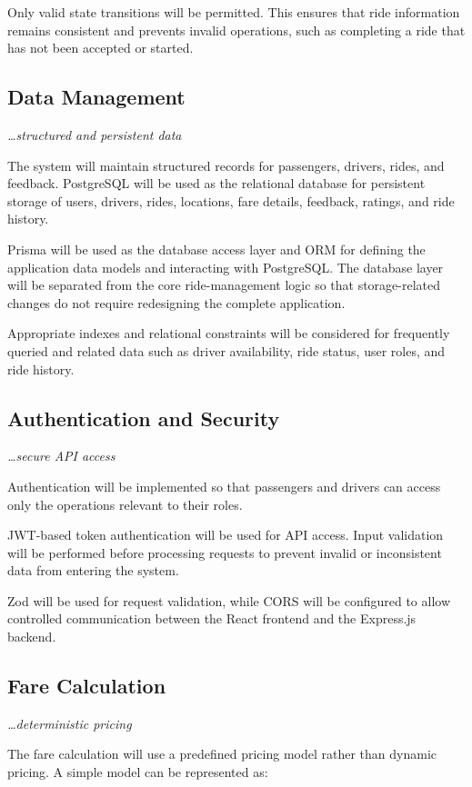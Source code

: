 \documentclass[11pt,a4paper]{article}
\newcommand{\BvrHint}[1]{%
  {\normalfont\normalsize\itshape\hfill #1}}
\begin{document}
Only valid state transitions will be permitted. This ensures that
ride information remains consistent and prevents invalid operations,
such as completing a ride that has not been accepted or started.


\subsection{Data Management}
\BvrHint{\ldots structured and persistent data}

The system will maintain structured records for passengers, drivers,
rides, and feedback. PostgreSQL will be used as the relational
database for persistent storage of users, drivers, rides, locations,
fare details, feedback, ratings, and ride history.

Prisma will be used as the database access layer and ORM for defining
the application data models and interacting with PostgreSQL. The
database layer will be separated from the core ride-management logic
so that storage-related changes do not require redesigning the
complete application.

Appropriate indexes and relational constraints will be considered
for frequently queried and related data such as driver availability,
ride status, user roles, and ride history.


\subsection{Authentication and Security}
\BvrHint{\ldots secure API access}

Authentication will be implemented so that passengers and drivers
can access only the operations relevant to their roles.

JWT-based token authentication will be used for API access. Input
validation will be performed before processing requests to prevent
invalid or inconsistent data from entering the system.

Zod will be used for request validation, while CORS will be
configured to allow controlled communication between the React
frontend and the Express.js backend.


\subsection{Fare Calculation}
\BvrHint{\ldots deterministic pricing}

The fare calculation will use a predefined pricing model rather than
dynamic pricing. A simple model can be represented as:
\end{document}
